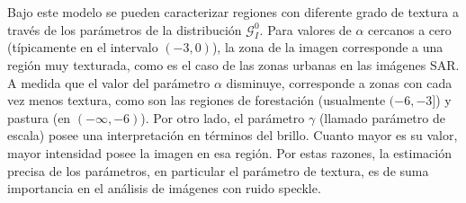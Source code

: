\documentclass[11pt]{article}
\begin{document}
Bajo este modelo se pueden caracterizar regiones con diferente grado de textura a través de los parámetros de la distribución $\mathcal{G}_I^{0}$. Para valores de $\alpha$ cercanos a cero (típicamente en el intervalo $(-3,0)$), la zona de la imagen corresponde a una región muy texturada, como es el caso de las zonas urbanas en las imágenes SAR. A medida que el valor del parámetro $\alpha$ disminuye, corresponde a zonas con cada vez menos textura, como son las regiones de forestación (usualmente $(-6,-3]$) y pastura (en $(-\infty,-6)$). Por otro lado, el parámetro $\gamma$ (llamado parámetro de escala) posee una interpretación en términos del brillo. Cuanto mayor es su valor, mayor intensidad posee la imagen en esa región. Por estas razones, la estimación precisa de los parámetros, en particular el parámetro de textura, es de suma importancia en el análisis de imágenes con ruido speckle. 



\end{document}
